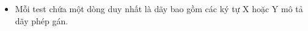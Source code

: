 \begin{itemize}
	\item     Mỗi test chứa một dòng duy nhất là dãy bao gồm các ký tự X hoặc Y mô tả dãy phép gán.   
\end{itemize}